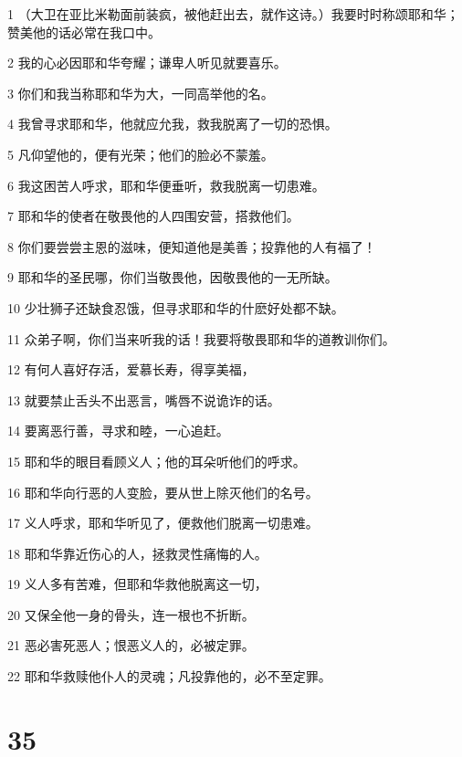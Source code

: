 \par 1 （大卫在亚比米勒面前装疯，被他赶出去，就作这诗。）我要时时称颂耶和华；赞美他的话必常在我口中。
\par 2 我的心必因耶和华夸耀；谦卑人听见就要喜乐。
\par 3 你们和我当称耶和华为大，一同高举他的名。
\par 4 我曾寻求耶和华，他就应允我，救我脱离了一切的恐惧。
\par 5 凡仰望他的，便有光荣；他们的脸必不蒙羞。
\par 6 我这困苦人呼求，耶和华便垂听，救我脱离一切患难。
\par 7 耶和华的使者在敬畏他的人四围安营，搭救他们。
\par 8 你们要尝尝主恩的滋味，便知道他是美善；投靠他的人有福了！
\par 9 耶和华的圣民哪，你们当敬畏他，因敬畏他的一无所缺。
\par 10 少壮狮子还缺食忍饿，但寻求耶和华的什麽好处都不缺。
\par 11 众弟子啊，你们当来听我的话！我要将敬畏耶和华的道教训你们。
\par 12 有何人喜好存活，爱慕长寿，得享美福，
\par 13 就要禁止舌头不出恶言，嘴唇不说诡诈的话。
\par 14 要离恶行善，寻求和睦，一心追赶。
\par 15 耶和华的眼目看顾义人；他的耳朵听他们的呼求。
\par 16 耶和华向行恶的人变脸，要从世上除灭他们的名号。
\par 17 义人呼求，耶和华听见了，便救他们脱离一切患难。
\par 18 耶和华靠近伤心的人，拯救灵性痛悔的人。
\par 19 义人多有苦难，但耶和华救他脱离这一切，
\par 20 又保全他一身的骨头，连一根也不折断。
\par 21 恶必害死恶人；恨恶义人的，必被定罪。
\par 22 耶和华救赎他仆人的灵魂；凡投靠他的，必不至定罪。

\chapter{35}

